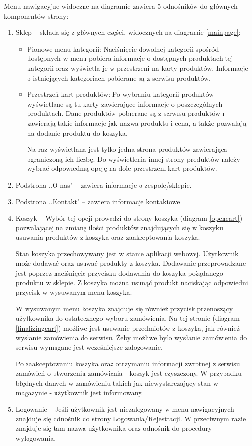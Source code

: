 \documentclass[11pt,a4paper,twoside]{article}
\begin{document}
Menu nawigacyjne widoczne na diagramie zawiera 5 odnośników do głównych komponentów strony:
\begin{enumerate}
\item Sklep -- składa się z głównych części, widocznych na diagramie \ref{mainpage}:
\begin{itemize}
\item Pionowe menu kategorii: Naciśnięcie dowolnej kategorii spośród dostępnych w menu pobiera informacje o dostępnych produktach tej kategorii oraz wyświetla je w przestrzeni na karty produktów. Informacje o istniejących kategoriach pobierane są z serwisu produktów.
\item Przestrzeń kart produktów: Po  wybraniu kategorii produktów wyświetlane są tu karty zawierające informacje o poszczególnych produktach. Dane produktów pobierane są z serwisu produktów i zawierają takie informacje jak nazwa produktu i cena, a także pozwalają na dodanie produktu do koszyka.

Na raz wyświetlana jest tylko jedna strona produktów zawierająca ograniczoną ich liczbę. Do wyświetlenia innej strony produktów należy wybrać odpowiednią opcję na dole przestrzeni kart produktów.
\end{itemize}

\item Podstrona ,,O nas" -- zawiera informacje o zespole/sklepie.
\item Podstrona ..Kontakt" -- zawiera informacje kontaktowe
\item Koszyk -- Wybór tej opcji prowadzi do strony koszyka (diagram \ref{opencart}) pozwalającej na zmianę ilości produktów znajdujących się w koszyku, usuwania produktów z koszyka oraz zaakceptowania koszyka.

Stan koszyka przechowywany jest  w stanie aplikacji webowej. Użytkownik może dodawać oraz usuwać produkty z koszyka. Dodawanie przeprowadzane jest poprzez naciśnięcie przycisku dodawania do koszyka pożądanego produktu w sklepie. Z koszyka można usunąć produkt naciskając odpowiedni przycisk w wysuwanym menu koszyka.

W wysuwanym menu koszyka znajduje się również przycisk przenoszący użytkownika do ostatecznego wyboru zamówienia. Na tej stronie (diagram \ref{finalizingcart}) możliwe jest usuwanie przedmiotów z koszyka, jak również wysłanie zamówienia do serwisu. Żeby możliwe było wysłanie zamówienia do serwisu wymagane jest wcześniejsze zalogowanie.

Po zaakceptowaniu koszyka oraz otrzymaniu informacji zwrotnej z serwisu zamówień o utworzeniu zamówienia - koszyk jest czyszczony. W przypadku błędnych danych w zamówieniu takich jak niewystarczający stan w magazynie - użytkownik jest informowany.
\item Logowanie -- Jeśli użytkownik jest niezalogowany w menu nawigacyjnych znajduje się odnośnik do strony Logowania/Rejestracji. W przeciwnym razie znajduje się tam nazwa użytkownika oraz odnośnik do procedury wylogowania.


\end{enumerate}
\end{document}

